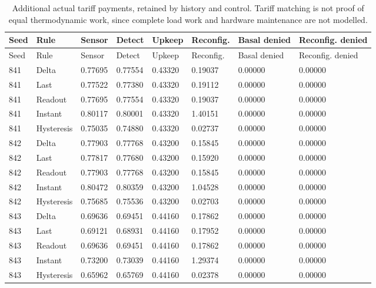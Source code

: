 \begin{longtable}{llllllll}
\caption{Additional actual tariff payments, retained by history and control. Tariff matching is not proof of equal thermodynamic work, since complete load work and hardware maintenance are not modelled.}\label{tab:physical-state-fees}\\
\toprule
Seed & Rule & Sensor & Detect & Upkeep & Reconfig. & Basal denied & Reconfig. denied \\
\midrule
\endfirsthead
\toprule
Seed & Rule & Sensor & Detect & Upkeep & Reconfig. & Basal denied & Reconfig. denied \\
\midrule
\endhead
841 & Delta & 0.77695 & 0.77554 & 0.43320 & 0.19037 & 0.00000 & 0.00000 \\
841 & Last & 0.77522 & 0.77380 & 0.43320 & 0.19112 & 0.00000 & 0.00000 \\
841 & Readout & 0.77695 & 0.77554 & 0.43320 & 0.19037 & 0.00000 & 0.00000 \\
841 & Instant & 0.80117 & 0.80001 & 0.43320 & 1.40151 & 0.00000 & 0.00000 \\
841 & Hysteresis & 0.75035 & 0.74880 & 0.43320 & 0.02737 & 0.00000 & 0.00000 \\
842 & Delta & 0.77903 & 0.77768 & 0.43200 & 0.15845 & 0.00000 & 0.00000 \\
842 & Last & 0.77817 & 0.77680 & 0.43200 & 0.15920 & 0.00000 & 0.00000 \\
842 & Readout & 0.77903 & 0.77768 & 0.43200 & 0.15845 & 0.00000 & 0.00000 \\
842 & Instant & 0.80472 & 0.80359 & 0.43200 & 1.04528 & 0.00000 & 0.00000 \\
842 & Hysteresis & 0.75685 & 0.75536 & 0.43200 & 0.02703 & 0.00000 & 0.00000 \\
843 & Delta & 0.69636 & 0.69451 & 0.44160 & 0.17862 & 0.00000 & 0.00000 \\
843 & Last & 0.69121 & 0.68931 & 0.44160 & 0.17952 & 0.00000 & 0.00000 \\
843 & Readout & 0.69636 & 0.69451 & 0.44160 & 0.17862 & 0.00000 & 0.00000 \\
843 & Instant & 0.73200 & 0.73039 & 0.44160 & 1.29374 & 0.00000 & 0.00000 \\
843 & Hysteresis & 0.65962 & 0.65769 & 0.44160 & 0.02378 & 0.00000 & 0.00000 \\
\bottomrule
\end{longtable}
